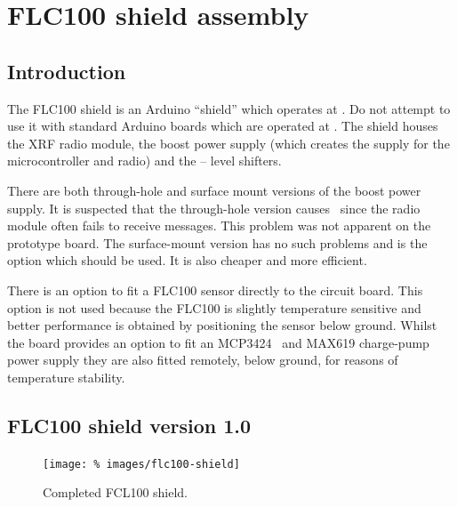 \chapter{FLC100 shield assembly}

\section{Introduction}
The FLC100 shield is an Arduino ``shield'' which operates at
. Do not attempt to use it with standard Arduino boards
which are operated at . The shield houses the XRF radio
module, the boost power supply (which creates the  supply
for the microcontroller and radio) and the  --  level
shifters.

There are both through-hole and surface mount versions of the boost
power supply. It is suspected that the through-hole version causes
\rfi\ since the radio module often fails to receive messages. This
problem was not apparent on the prototype board. The surface-mount
version has no such problems and is the option which should be
used. It is also cheaper and more efficient.

There is an option to fit a FLC100 sensor directly to the circuit
board. This option is not used because the FLC100 is slightly
temperature sensitive and better performance is obtained by
positioning the sensor below ground. Whilst the board provides an
option to fit an MCP3424 \adc\ and MAX619 charge-pump power supply they
are also fitted remotely, below ground, for reasons of temperature
stability.

\section{FLC100 shield version 1.0}

\begin{figure}
  \centering
  \texttt{[image: \%
    images/flc100-shield]}
  \caption[Completed FLC100 shield]{Completed FCL100 shield. %
    }
  \label{fig:flc100-v1.0}
\end{figure}

